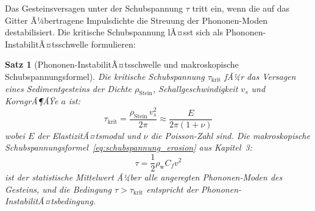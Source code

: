 ﻿\documentclass[12pt,a4paper]{report}
\newtheorem{theorem}{Satz}[chapter]
\begin{document}
Das Gesteinsversagen unter der Schubspannung $\tau$ tritt ein, wenn die auf das Gitter Ã¼bertragene Impulsdichte die Streuung der Phononen-Moden destabilisiert. Die kritische Schubspannung lÃ¤sst sich als Phononen-InstabilitÃ¤tsschwelle formulieren:

\begin{theorem}[Phononen-InstabilitÃ¤tsschwelle und makroskopische Schubspannungsformel]
	\label{thm:phononen}
	Die kritische Schubspannung $\tau_\mathrm{krit}$ fÃ¼r das Versagen eines Sedimentgesteins der Dichte $\rho_\mathrm{Stein}$, Schallgeschwindigkeit $v_s$ und KorngrÃ¶ÃŸe $a$ ist:
	\begin{equation}
		\tau_\mathrm{krit} = \frac{\rho_\mathrm{Stein}\,v_s^2}{2\pi} \approx \frac{E}{2\pi(1+\nu)}
		\label{eq:tau_krit_phonon}
	\end{equation}
	wobei $E$ der ElastizitÃ¤tsmodul und $\nu$ die Poisson-Zahl sind. Die makroskopische Schubspannungsformel~\eqref{eq:schubspannung_erosion} aus Kapitel~3:
	\begin{equation}
		\tau = \frac{1}{2}\rho_\mathrm{w} C_f v^2
		\label{eq:schubspannung_erosion}
	\end{equation}
	ist der statistische Mittelwert Ã¼ber alle angeregten Phononen-Moden des Gesteins, und die Bedingung $\tau > \tau_\mathrm{krit}$ entspricht der Phononen-InstabilitÃ¤tsbedingung.
\end{theorem}
\end{document}
